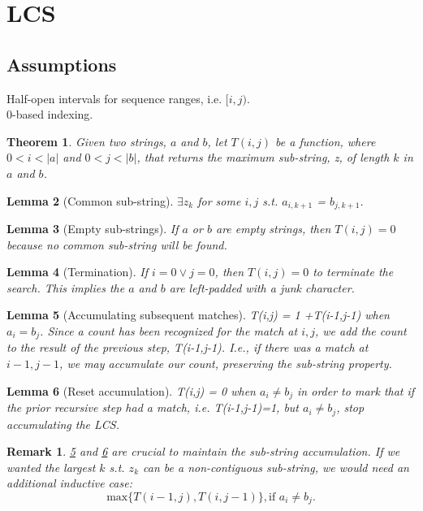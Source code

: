 \documentclass{article}
\newtheorem{theorem}{Theorem}[section]
\newtheorem{lemma}[theorem]{Lemma}
\newtheorem{remark}{Remark}
\begin{document}
	
	\section{LCS}
	\subsection*{Assumptions}
	Half-open intervals for sequence ranges, i.e. $[i,j)$.\\
	0-based indexing.
	
	\begin{theorem}
	Given two strings, $a$ and $b$, let $T(i, j)$ be a function, where $0 < i < |a|$ and $0 < j < |b|$, that returns the 
	maximum sub-string, z, of length $k$ in $a$ and $b$.
	\end{theorem}
	
	\begin{lemma} [Common sub-string]
	\label{zk}	
	$\exists z_k$ for some $i, j$ s.t. $a_{i, k+1}$ = $b_{j, k+1}$.
	\end{lemma}
	
	\begin{lemma} [Empty sub-strings]
	\label{cs}	
	If $a$ or $b$ are empty strings, then $T(i,j)=0$ because no common sub-string will be found.
	\end{lemma}
	
	\begin{lemma} [Termination]
	\label{term}	
	If $i=0 \vee j=0$, then $T(i,j)=0$ to terminate the search. This implies the $a$ and $b$ are left-padded with a junk character.
	\end{lemma}
	
	\begin{lemma} [Accumulating subsequent matches]
	\label{match}	
	T(i,j) = 1 +T(i-1,j-1) when  $a_i = b_j$. Since a count has been recognized for the match at $i, j$, we add the count to the result of the previous step, T(i-1,j-1). I.e.,
	if there was a match at $i-1, j-1$, we may accumulate our count, preserving the sub-string property.
	\end{lemma}
	
	\begin{lemma} [Reset accumulation]
	\label{reset}	
	T(i,j) = 0 when  $a_i \neq b_j$ in order to mark that if the prior recursive step had a match, i.e. T(i-1,j-1)=1, but $a_i \neq b_j$, stop accumulating the LCS.
	\end{lemma}
	
	\begin{remark}
	\ref{match} and \ref{reset} are crucial to maintain the sub-string accumulation. If we wanted the largest $k$ s.t. $z_k$ can be a non-contiguous sub-string, we would need
	an additional inductive case:
	$$\text{max}\{T(i-1,j), T(i,j-1)\}, \text{if $a_i \neq b_j$.}$$
	\end{remark}
	
\end{document}
